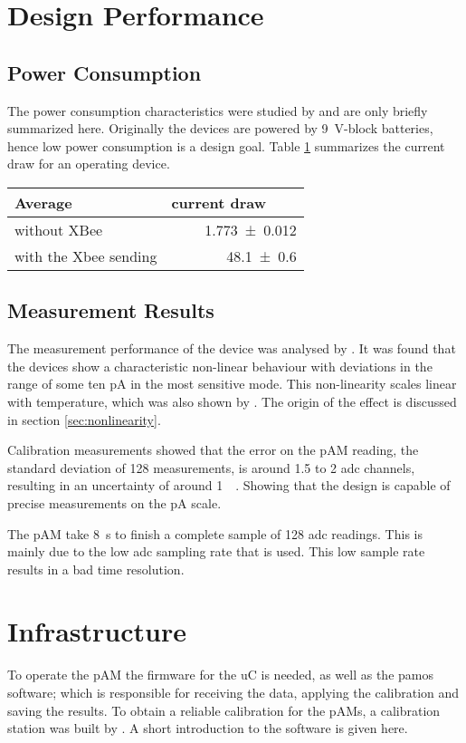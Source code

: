 \section{Design Performance}
\subsection{Power Consumption}
The power consumption characteristics were studied by \cite{rudolph} and are only briefly summarized here. Originally the devices are powered by \SI{9}{\volt}-block batteries, hence low power consumption is a design goal. Table \ref{tab:frontend:old:power} summarizes the current draw for an operating device.
\begin{table}
	\centering
	\begin{tabular}{lr}
		\hline
		Average & current draw \SI[per-mode=symbol]{}{\per\milli\amp}\\ \hline
		without XBee & \SI{1.773\pm0.012}{} \\
		with the Xbee sending & \SI{48.1\pm0.6}{} \\
		\hline
	\end{tabular}
	\label{tab:frontend:old:power}
\end{table}
\subsection{Measurement Results}
The measurement performance of the device was analysed by \cite{roedel}. It was found that the devices show a characteristic non-linear behaviour with deviations in the range of some ten \ac{pA} in the most sensitive mode. This non-linearity scales linear with temperature, which was also shown by \cite{roedel}. The origin of the effect is discussed in section \ref{sec:nonlinearity}.

Calibration measurements showed that the error on the \ac{pAM} reading, the standard deviation of 128 measurements, is around 1.5 to 2 \ac{adc} channels, resulting in an uncertainty of around \SI{1}{\pico\amp}. Showing that the design is capable of precise measurements on the \ac{pA} scale.

The \ac{pAM} take \SI{8}{\second} to finish a complete sample of 128 \ac{adc} readings. This is mainly due to the low \ac{adc} sampling rate that is used. This low sample rate results in a bad time resolution.

\section{Infrastructure}
To operate the \ac{pAM} the firmware for the \ac{uC} is needed, as well as the \ac{pamos} software; which is responsible for receiving the data, applying the calibration and saving the results. To obtain a reliable calibration for the \acp{pAM}, a calibration station was built by \cite{roedel}. A short introduction to the software is given here.
